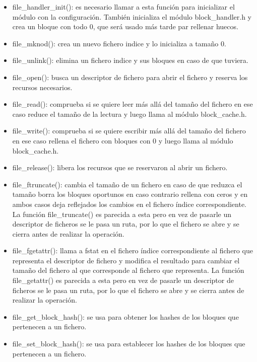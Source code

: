 \documentclass[a4paper,12pt]{article}
\begin{document}
\begin{itemize}
\item file\_handler\_init(): es necesario llamar a esta función para inicializar el módulo con la configuración. También inicializa el módulo block\_handler.h y crea un bloque con todo 0, que será  usado más tarde par rellenar huecos.

\item file\_mknod(): crea un nuevo fichero indice y lo inicializa a tamaño 0.

\item file\_unlink(): elimina un fichero indice y sus bloques en caso de que tuviera.

\item file\_open(): busca un descriptor de fichero para abrir el fichero y reserva los recursos necesarios.

\item file\_read(): comprueba si se quiere leer más allá del tamaño del fichero en ese caso reduce el tamaño de la lectura y luego llama al módulo block\_cache.h.

\item file\_write(): comprueba si se quiere escribir más allá del tamaño del fichero en ese caso rellena el fichero con bloques con 0 y luego llama al módulo block\_cache.h.

\item file\_release(): libera los recursos que se reservaron al abrir un fichero.

\item file\_ftruncate(): cambia el tamaño de un fichero en caso de que reduzca el tamaño borra los bloques oportunos en caso contrario rellena con ceros y en ambos casos deja reflejados los cambios en el fichero índice correspondiente. La función file\_truncate() es parecida a esta pero en vez de pasarle un descriptor de ficheros se le pasa un ruta, por lo que el fichero se abre y se cierra antes de realizar la operación.

\item file\_fgetattr(): llama a fstat en el fichero índice correspondiente al fichero que representa el descriptor de fichero y modifica el resultado para cambiar el tamaño del fichero al que corresponde al fichero que representa. La función file\_getattr() es parecida a esta pero en vez de pasarle un descriptor de ficheros se le pasa un ruta, por lo que el fichero se abre y se cierra antes de realizar la operación.

\item file\_get\_block\_hash(): se usa para obtener los hashes de los bloques que pertenecen a un fichero.

\item file\_set\_block\_hash(): se usa para establecer los hashes de los bloques que pertenecen a un fichero.
\end{itemize}
\end{document}
